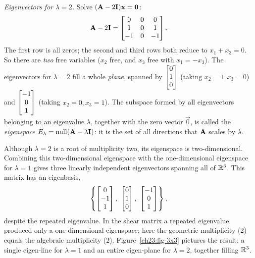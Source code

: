 \begin{example}
\emph{Eigenvectors for $\lambda=2$.} Solve $(\mathbf{A}-2\mathbf{I})\mathbf{x}=\mathbf{0}$:
\[
  \mathbf{A}-2\mathbf{I}=\begin{bmatrix}0 & 0 & 0\\ 1 & 0 & 1\\ -1 & 0 & -1\end{bmatrix}.
\]
The first row is all zeros; the second and third rows both reduce to
$x_1+x_3=0$. So there are \emph{two} free variables ($x_2$ free, and $x_3$ free
with $x_1=-x_3$). The eigenvectors for $\lambda=2$ fill a whole \emph{plane},
spanned by $\begin{bmatrix}0\\1\\0\end{bmatrix}$ (taking $x_2=1,x_3=0$) and $\begin{bmatrix}-1\\0\\1\end{bmatrix}$
(taking $x_2=0,x_3=1$). The subspace formed by all eigenvectors belonging to an
eigenvalue $\lambda$, together with the zero vector $\vec{0}$, is called the
\emph{eigenspace} $E_\lambda = \operatorname{null}(\mathbf{A}-\lambda\mathbf{I})$:
it is the set of all directions that $\mathbf{A}$ scales by $\lambda$.

Although $\lambda=2$ is a root of multiplicity two, its eigenspace is two-dimensional.
Combining this two-dimensional eigenspace with the one-dimensional eigenspace for $\lambda=1$
gives three linearly independent eigenvectors spanning all of $\mathbb{R}^3$. This matrix has an
eigenbasis,
\[
  \left\{\colvec{0\\-1\\1},\ \colvec{0\\1\\0},\ \colvec{-1\\0\\1}\right\},
\]
despite the repeated eigenvalue. In the shear matrix a repeated eigenvalue produced
only a one-dimensional eigenspace; here the geometric multiplicity ($2$) equals the
algebraic multiplicity ($2$).
Figure~\ref{ch23:fig-3x3} pictures the result: a single eigen-line for $\lambda=1$ and an entire
eigen-plane for $\lambda=2$, together filling $\mathbb{R}^3$.
\end{example}

